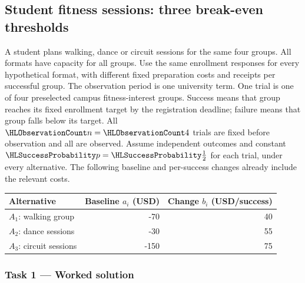 \subsection{Student fitness sessions: three break-even thresholds}\label{prob:defects}
\label{prob:c4-agriculture}
A student plans walking, dance or circuit sessions for the same four groups. All formats have capacity for all groups. Use the same enrollment responses for every hypothetical format, with different fixed preparation costs and receipts per successful group.
The observation period is one university term. One trial is one of four preselected campus fitness-interest groups.
Success means that group reaches its fixed enrollment target by the registration deadline; failure means that group falls below its target.
All $\TrialCount{n}=\TrialCount{4}$ trials are fixed before observation and all are observed.
Assume independent outcomes and constant $\SuccessProb{p}=\SuccessProb{\frac{1}{2}}$ for each trial, under every alternative.
The following baseline and per-success changes already include the relevant costs.
\begin{center}\begin{tabular}{lrr}\toprule Alternative & Baseline $a_i$ (USD) & Change $b_i$ (USD/success)\\\midrule
$A_1$: walking group & -70 & 40\\
$A_2$: dance sessions & -30 & 55\\
$A_3$: circuit sessions & -150 & 75\\
\bottomrule\end{tabular}\end{center}
\clearpage\subsubsection*{Task 1 --- Worked solution}\label{sol:c4-agriculture-model}

